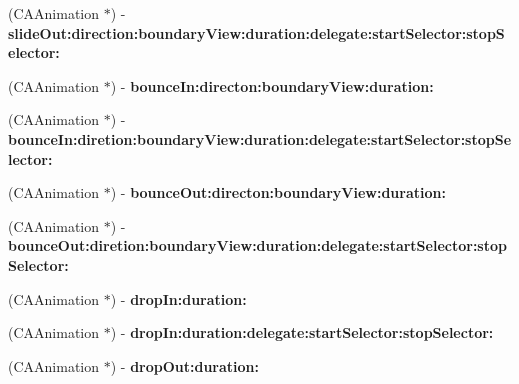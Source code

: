 \begin{DoxyCompactItemize}
\item 
\hypertarget{interface_t_x_s_animation_factory_a9ff091627472b443b53aa4b87032a33b}{}(C\+A\+Animation $\ast$) -\/ {\bfseries slide\+Out\+:direction\+:boundary\+View\+:duration\+:delegate\+:start\+Selector\+:stop\+Selector\+:}\label{interface_t_x_s_animation_factory_a9ff091627472b443b53aa4b87032a33b}

\item 
\hypertarget{interface_t_x_s_animation_factory_a1769dd2d5a47eddc53cc71f697eaa824}{}(C\+A\+Animation $\ast$) -\/ {\bfseries bounce\+In\+:directon\+:boundary\+View\+:duration\+:}\label{interface_t_x_s_animation_factory_a1769dd2d5a47eddc53cc71f697eaa824}

\item 
\hypertarget{interface_t_x_s_animation_factory_a40f6a7e76193605e9c8c4e9f5818ff1c}{}(C\+A\+Animation $\ast$) -\/ {\bfseries bounce\+In\+:diretion\+:boundary\+View\+:duration\+:delegate\+:start\+Selector\+:stop\+Selector\+:}\label{interface_t_x_s_animation_factory_a40f6a7e76193605e9c8c4e9f5818ff1c}

\item 
\hypertarget{interface_t_x_s_animation_factory_a6893dbda72938cc9fb717a256e1bcbd5}{}(C\+A\+Animation $\ast$) -\/ {\bfseries bounce\+Out\+:directon\+:boundary\+View\+:duration\+:}\label{interface_t_x_s_animation_factory_a6893dbda72938cc9fb717a256e1bcbd5}

\item 
\hypertarget{interface_t_x_s_animation_factory_aed06c7e286f132a0539dd0f00cb3a31e}{}(C\+A\+Animation $\ast$) -\/ {\bfseries bounce\+Out\+:diretion\+:boundary\+View\+:duration\+:delegate\+:start\+Selector\+:stop\+Selector\+:}\label{interface_t_x_s_animation_factory_aed06c7e286f132a0539dd0f00cb3a31e}

\item 
\hypertarget{interface_t_x_s_animation_factory_a0ca8b08612046f4ce14d0ac2a9e44794}{}(C\+A\+Animation $\ast$) -\/ {\bfseries drop\+In\+:duration\+:}\label{interface_t_x_s_animation_factory_a0ca8b08612046f4ce14d0ac2a9e44794}

\item 
\hypertarget{interface_t_x_s_animation_factory_abdbe4d2ac12afda5ad782f0b582773c1}{}(C\+A\+Animation $\ast$) -\/ {\bfseries drop\+In\+:duration\+:delegate\+:start\+Selector\+:stop\+Selector\+:}\label{interface_t_x_s_animation_factory_abdbe4d2ac12afda5ad782f0b582773c1}

\item 
\hypertarget{interface_t_x_s_animation_factory_a0491176fd173b633d2d7581bb51d5cad}{}(C\+A\+Animation $\ast$) -\/ {\bfseries drop\+Out\+:duration\+:}\label{interface_t_x_s_animation_factory_a0491176fd173b633d2d7581bb51d5cad}


\end{DoxyCompactItemize}

